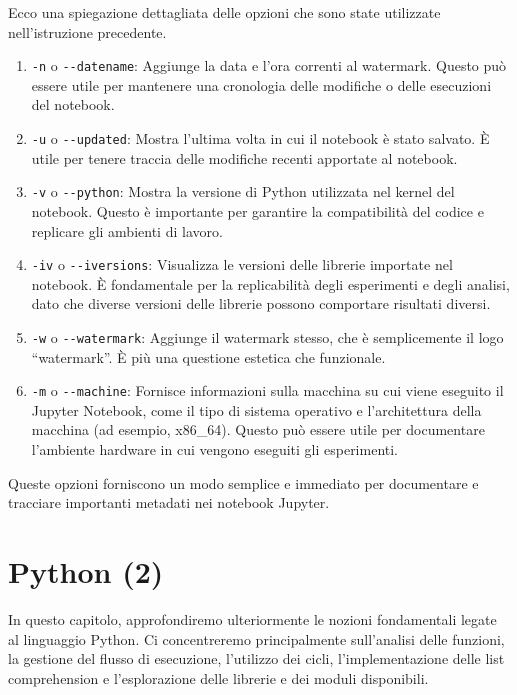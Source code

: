 \documentclass[
  letterpaper,
  krantz2]{{[}./krantz{]}}
\begin{document}
Ecco una spiegazione dettagliata delle opzioni che sono state utilizzate
nell'istruzione precedente.

\begin{enumerate}
\def\labelenumi{\arabic{enumi}.}
\item
  \texttt{-n} o \texttt{-\/-datename}: Aggiunge la data e l'ora correnti
  al watermark. Questo può essere utile per mantenere una cronologia
  delle modifiche o delle esecuzioni del notebook.
\item
  \texttt{-u} o \texttt{-\/-updated}: Mostra l'ultima volta in cui il
  notebook è stato salvato. È utile per tenere traccia delle modifiche
  recenti apportate al notebook.
\item
  \texttt{-v} o \texttt{-\/-python}: Mostra la versione di Python
  utilizzata nel kernel del notebook. Questo è importante per garantire
  la compatibilità del codice e replicare gli ambienti di lavoro.
\item
  \texttt{-iv} o \texttt{-\/-iversions}: Visualizza le versioni delle
  librerie importate nel notebook. È fondamentale per la replicabilità
  degli esperimenti e degli analisi, dato che diverse versioni delle
  librerie possono comportare risultati diversi.
\item
  \texttt{-w} o \texttt{-\/-watermark}: Aggiunge il watermark stesso,
  che è semplicemente il logo ``watermark''. È più una questione
  estetica che funzionale.
\item
  \texttt{-m} o \texttt{-\/-machine}: Fornisce informazioni sulla
  macchina su cui viene eseguito il Jupyter Notebook, come il tipo di
  sistema operativo e l'architettura della macchina (ad esempio,
  x86\_64). Questo può essere utile per documentare l'ambiente hardware
  in cui vengono eseguiti gli esperimenti.
\end{enumerate}

Queste opzioni forniscono un modo semplice e immediato per documentare e
tracciare importanti metadati nei notebook Jupyter.

\chapter{Python (2)}\label{sec-python-2}

In questo capitolo, approfondiremo ulteriormente le nozioni fondamentali
legate al linguaggio Python. Ci concentreremo principalmente
sull'analisi delle funzioni, la gestione del flusso di esecuzione,
l'utilizzo dei cicli, l'implementazione delle list comprehension e
l'esplorazione delle librerie e dei moduli disponibili.
\end{document}
